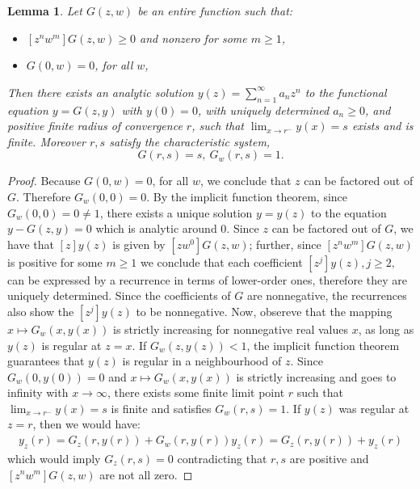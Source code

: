 \documentclass{amsart}
\theoremstyle{plain}
\newtheorem{lemma}{Lemma}
\begin{document}
\begin{lemma}\label{lemma:implicitsing}
Let $G(z,w)$ be an entire  function such that:
\begin{itemize}
    \item $[z^nw^m]G(z,w) \geq 0$ and nonzero for some $m\geq 1$,
    \item $G(0,w) = 0$, for all $w$,
 \end{itemize}
  Then there exists an analytic solution $y(z) = \sum_{n=1}^{\infty}a_nz^n$ to the functional
equation $y=G(z,y)$ with $y(0)=0$, with uniquely determined $a_n \geq 0$,   and  positive finite radius of convergence $r$, such that   $\lim_{x \rightarrow r^{-}} y(x) = s$ exists and is finite.  Moreover $r,s$ satisfy the {\em characteristic} system,
\begin{equation*}
    G(r,s) = s,  \ 
    G_w(r,s) = 1.
\end{equation*}
\end{lemma}
\begin{proof}
 Because $G(0,w) = 0$, for all $w$, we conclude that $z$ can be factored out of $G$. Therefore $G_w(0,0) = 0$. By the implicit function theorem, since $G_w(0,0) = 0 \neq 1$, there exists
a unique solution $y= y(z)$  to the  equation $y-G(z,y)=0$ which is analytic around $0$. Since $z$ can be factored out of $G$, we have that $[z]y(z)$ is given by $[zw^0]G(z,w)$;  further, since $[z^nw^m]G(z,w)$ is positive for some $m\geq 1$ we conclude that each 
coefficient $[z^j]y(z), j\geq 2,$ can be expressed by a recurrence in terms of lower-order ones, therefore they are uniquely determined. Since the coefficients of $G$ are nonnegative, the recurrences also show the $[z^j]y(z)$ to be nonnegative.  Now, obsereve that the mapping $x \mapsto G_w(x,y(x))$ is  strictly increasing for
nonnegative real values $x$, as long as $y(z)$ is regular at $z=x$. 
If $G_w(z,y(z)) < 1$, the implicit function theorem guarantees that
$y(z)$ is regular in a neighbourhood of $z$. Since $G_w(0,y(0)) = 0$ and $x \mapsto G_w(x,y(x))$ is strictly increasing and goes to infinity with $x\rightarrow \infty$, there
exists some finite limit point $r$ such that 
$\lim_{x\rightarrow r^-} y(x) = s$ is finite 
and satisfies $G_w(r,s)=1$. If $y(z)$ was regular at $z=r$,
then we would have:
\begin{align}
y_z(r) = G_z(r,y(r)) + G_w(r,y(r))y_z(r) = G_z(r,y(r)) + y_z(r)
\end{align}
which would imply $G_z(r,s) = 0$ contradicting
that $r,s$ are positive  and  $[z^nw^m]G(z,w)$ are not all zero.\end{proof}
\end{document}
